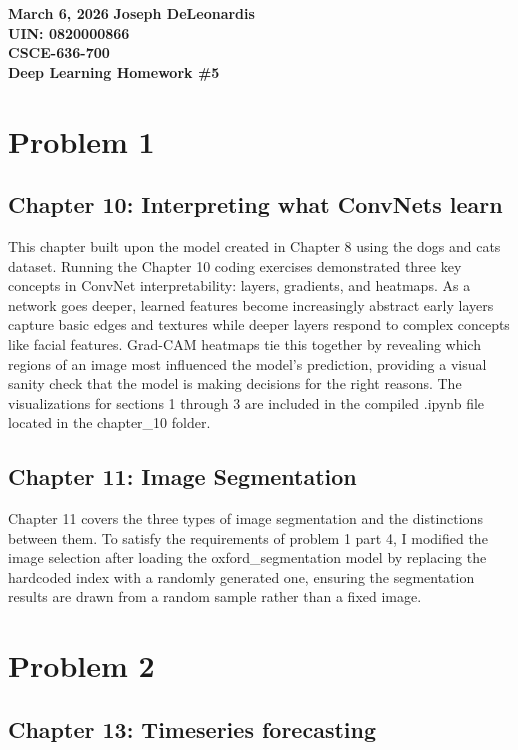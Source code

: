 \documentclass[11pt]{article}
\begin{document}
\noindent
\textbf{March 6, 2026} \hfill \textbf{Joseph DeLeonardis} \\
\textbf{UIN: 0820000866} \\
\textbf{CSCE-636-700} \\
\textbf{Deep Learning Homework \#5}

\section*{Problem 1}

\subsection*{Chapter 10: Interpreting what ConvNets learn}
This chapter built upon the model created in Chapter 8 using the dogs and cats dataset. Running the Chapter 10 coding exercises demonstrated three key concepts in ConvNet interpretability: layers, gradients, and heatmaps. As a network goes deeper, learned features become increasingly abstract early layers capture basic edges and textures while deeper layers respond to complex concepts like facial features. Grad-CAM heatmaps tie this together by revealing which regions of an image most influenced the model's prediction, providing a visual sanity check that the model is making decisions for the right reasons.
\newline
The visualizations for sections 1 through 3 are included in the compiled .ipynb file located in the chapter\_10 folder.

\subsection*{Chapter 11: Image Segmentation}
Chapter 11 covers the three types of image segmentation and the distinctions between them. To satisfy the requirements of problem 1 part 4, I modified the image selection after loading the oxford\_segmentation model by replacing the hardcoded index with a randomly generated one, ensuring the segmentation results are drawn from a random sample rather than a fixed image.


\section*{Problem 2}


\subsection*{Chapter 13: Timeseries forecasting}
\end{document}
